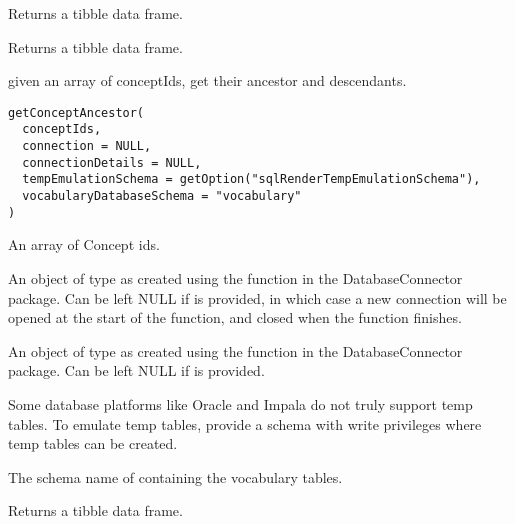 \documentclass[a4paper]{book}
\begin{document}
%
\begin{Value}
Returns a tibble data frame.

Returns a tibble data frame.
\end{Value}
%
\begin{Description}\relax
given an array of conceptIds, get their ancestor and descendants.
\end{Description}
%
\begin{Usage}
\begin{verbatim}
getConceptAncestor(
  conceptIds,
  connection = NULL,
  connectionDetails = NULL,
  tempEmulationSchema = getOption("sqlRenderTempEmulationSchema"),
  vocabularyDatabaseSchema = "vocabulary"
)
\end{verbatim}
\end{Usage}
%
\begin{Arguments}
\begin{ldescription}
\item[\code{conceptIds}] An array of Concept ids.

\item[\code{connection}] An object of type  as created using the
 function in the
DatabaseConnector package. Can be left NULL if 
is provided, in which case a new connection will be opened at the start
of the function, and closed when the function finishes.

\item[\code{connectionDetails}] An object of type  as created using the
 function in the
DatabaseConnector package. Can be left NULL if  is
provided.

\item[\code{tempEmulationSchema}] Some database platforms like Oracle and Impala do not truly support temp tables. To emulate temp 
tables, provide a schema with write privileges where temp tables can be created.

\item[\code{vocabularyDatabaseSchema}] The schema name of containing the vocabulary tables.
\end{ldescription}
\end{Arguments}
%
\begin{Value}
Returns a tibble data frame.
\end{Value}
\end{document}
